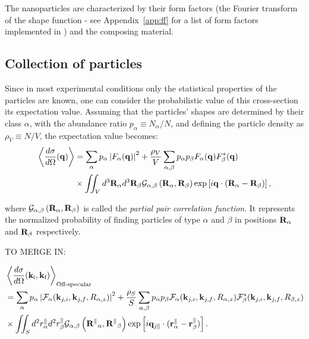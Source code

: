 
The nanoparticles are characterized by their form factors
(\idest the Fourier transform of the shape function - see Appendix~\ref{app:ff} for a list of form factors implemented in \BornAgain) and the composing material.



\subsection{Collection of particles} \label{sec:sect:interf}

Since in most experimental conditions only the statistical properties of the particles are known, one can consider the probabilistic value of this cross-section \idest its expectation value. Assuming that the particles' shapes are determined by their class $\alpha$, with the abundance ratio $p_\alpha \equiv N_\alpha / N$, and defining the particle density as $\rho_V \equiv N/V$, the expectation value becomes:
\begin{align*}
  \left\langle \frac{d\sigma}{d\Omega}(\mathbf{q}) \right\rangle  & = \sum_\alpha p_\alpha \left\lvert F_\alpha(\mathbf{q})\right\rvert ^2 + \frac{\rho_V}{V}\sum_{\alpha,\beta} p_\alpha p_\beta F_\alpha (\mathbf{q})F_\beta^*(\mathbf{q})  \\
  & \times \iint_V d^3\mathbf{R}_\alpha d^3\mathbf{R}_\beta \mathcal{G}_{\alpha ,\beta}\left( \mathbf{R}_{\alpha} , \mathbf{R}_{\beta} \right) \exp \left[ i\mathbf{q}\cdot (\mathbf{R}_\alpha - \mathbf{R}_\beta ) \right],
\end{align*}


where $\mathcal{G}_{\alpha ,\beta}\left( \mathbf{R}_{\alpha} , \mathbf{R}_{\beta} \right)$ is called the \emph{partial pair correlation function}. It represents the normalized probability of finding particles of type $\alpha$ and $\beta$ in positions $\mathbf{R}_\alpha$ and $\mathbf{R}_\beta$ respectively. 

TO MERGE IN:

\begin{align*}
  & \left\langle \frac{d\sigma}{d\Omega}(\mathbf{k}_{\text{i}},\mathbf{k}_{\text{f}}) \right\rangle_{\text{Off-specular}}  \\
  & = \sum_\alpha p_\alpha \left\lvert \mathcal{F}_\alpha(\mathbf{k}_{j,i},\mathbf{k}_{j,f}, R_{\alpha,z})\right\rvert ^2 + \frac{\rho_S}{S}\sum_{\alpha,\beta} p_\alpha p_\beta \mathcal{F}_\alpha (\mathbf{k}_{j,i},\mathbf{k}_{j,f}, R_{\alpha,z})\mathcal{F}_\beta^*(\mathbf{k}_{j,i},\mathbf{k}_{j,f}, R_{\beta,z}) \\
  & \times \iint_S d^2r_\alpha^\parallel d^2r_\beta^\parallel \mathcal{G}_{\alpha ,\beta}\left( \mathbf{R^\parallel}_{\alpha} , \mathbf{R^\parallel}_{\beta} \right) \exp \left[ i\mathbf{q}_{j\parallel}\cdot (\mathbf{r}_\alpha^\parallel - \mathbf{r}_\beta^\parallel ) \right].
\end{align*}


